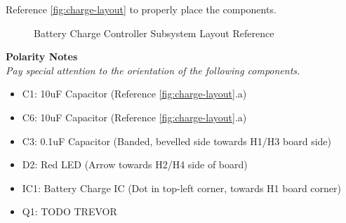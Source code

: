 \documentclass{article}
\begin{document}
Reference \autoref{fig:charge-layout} to properly place the components.

\begin{figure}[H]
    \centering
        \qquad
        \caption{Battery Charge Controller Subsystem Layout Reference}%
    \label{fig:charge-layout}%
\end{figure}

\noindent \textbf{Polarity Notes}\\
\noindent \textit{Pay special attention to the orientation of the following components.}
\begin{itemize}
  \item C1: 10uF Capacitor (Reference \autoref{fig:charge-layout}.a)
  \item C6: 10uF Capacitor (Reference \autoref{fig:charge-layout}.a)
  \item C3: 0.1uF Capacitor  (Banded, bevelled side towards H1/H3 board side)
  \item D2: Red LED (Arrow towards H2/H4 side of board)
  \item IC1: Battery Charge IC (Dot in top-left corner, towards H1 board corner)
  \item Q1: TODO TREVOR
\end{itemize}
\end{document}

